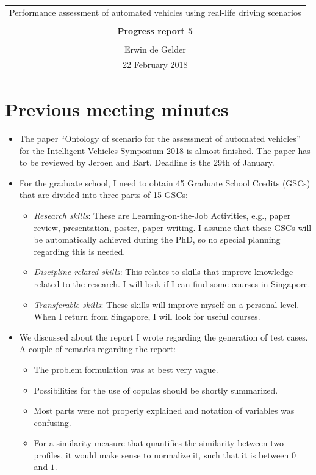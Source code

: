 \documentclass[10pt,final,a4paper,oneside,onecolumn]{article}
\newcommand{\progressreportnumber}{5}
\renewcommand{\author}{Erwin de Gelder}
\renewcommand{\date}{22 February 2018}
\renewcommand{\title}{Performance assessment of automated vehicles using real-life driving scenarios}
\begin{document}
	
\begin{center}
	\begin{tabular}{c}
		\title \\ \\
		\textbf{\huge Progress report \progressreportnumber} \\ \\
		\author \\ 
		\date
	\end{tabular}
\end{center}

\section{Previous meeting minutes}

\begin{itemize}
	\item The paper ``Ontology of scenario for the assessment of automated vehicles'' for the Intelligent Vehicles Symposium 2018 is almost finished. The paper has to be reviewed by Jeroen and Bart. Deadline is the 29th of January.
	\item For the graduate school, I need to obtain 45 Graduate School Credits (GSCs) that are divided into three parts of 15 GSCs:
	\begin{itemize}
		\item \emph{Research skills}: These are Learning-on-the-Job Activities, e.g., paper review, presentation, poster, paper writing. I assume that these GSCs will be automatically achieved during the PhD, so no special planning regarding this is needed.
		\item \emph{Discipline-related skills}: This relates to skills that improve knowledge related to the research. I will look if I can find some courses in Singapore.
		\item \emph{Transferable skills}: These skills will improve myself on a personal level. When I return from Singapore, I will look for useful courses.
	\end{itemize}
	\item We discussed about the report I wrote regarding the generation of test cases. A couple of remarks regarding the report:
	\begin{itemize}
		\item The problem formulation was at best very vague.
		\item Possibilities for the use of copulas should be shortly summarized.
		\item Most parts were not properly explained and notation of variables was confusing.
		\item For a similarity measure that quantifies the similarity between two profiles, it would make sense to normalize it, such that it is between $0$ and $1$.
	\end{itemize}
\end{itemize}
\end{document}
